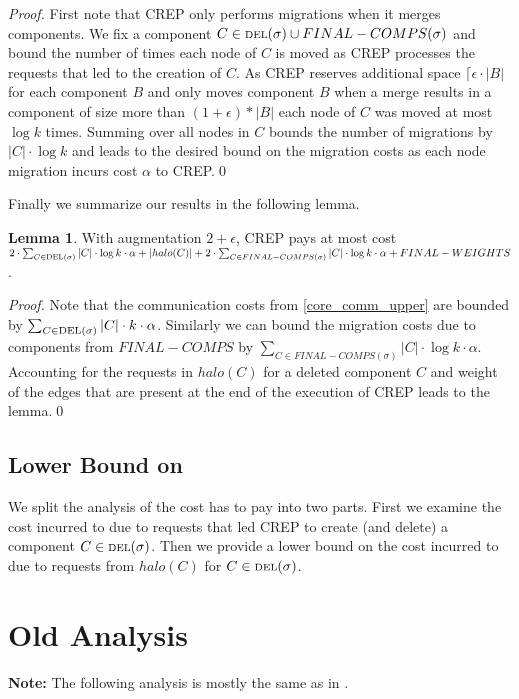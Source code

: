 \documentclass[xcolor=dvipsnames, tikz, 12pt]{article}
\newcommand{\nl}{\newline}
\newcommand{\crep}{C{\scriptsize REP}}
\newcommand{\del}{\text{\scriptsize DEL}}
\newcommand{\opt}{\text{O{\scriptsize PT}}}
\theoremstyle{definition}
\newtheorem{lemma}[defi]{Lemma}
\begin{document}
\textit{Proof.} First note that \crep{} only performs migrations when it merges components.
We fix a component $C\in\del{}(\sigma)\cup FINAL-COMPS(\sigma)$ and bound the number of times each node of $C$ is moved as \crep{} processes the requests that led to the creation of $C$. As \crep{} reserves additional space $\lceil\epsilon\cdot|B|$ for each component $B$ and only moves component $B$ when a merge results in a component of size more than $(1+\epsilon)*|B|$ each node of $C$ was moved at most
$\log k$ times. Summing over all nodes in $C$ bounds the number of migrations by $|C|\cdot\log k$ and leads to the desired bound on the migration costs as each node migration incurs cost $\alpha$ to \crep{}.\qed\nl

Finally we summarize our results in the following lemma.
\begin{lemma}
	\label{crep_upper_bound}
	With augmentation $2+\epsilon$, \crep{} pays at most cost $2\cdot\sum_{C\in\del{}(\sigma)}|C|\cdot\log k\cdot\alpha+|halo(C)|+2\cdot\sum_{C\in FINAL-COMPS(\sigma)}|C|\cdot\log k\cdot\alpha+FINAL-WEIGHTS$.
\end{lemma}
\textit{Proof.} Note that the communication costs from \cref{core_comm_upper} are bounded by $\sum_{C\in\del{}(\sigma)}|C|\cdot k\cdot\alpha$. Similarly we can bound the migration costs due to components from $FINAL-COMPS$ by $\sum_{C\in FINAL-COMPS(\sigma)}|C|\cdot\log k\cdot\alpha$. Accounting for the requests in $halo(C)$ for a deleted component $C$ and weight of the edges that are present at the end of the execution of \crep{} leads to the lemma.\qed


\subsection{Lower Bound on \opt{}}
We split the analysis of the cost \opt{} has to pay into two parts. First we examine the cost incurred to \opt{} due to requests that led \crep{} to create (and delete) a component $C\in\del{}(\sigma)$. Then we provide a lower bound on the cost incurred to \opt{} due to requests from $halo(C)$ for $C\in\del{}(\sigma)$.



\section{Old Analysis}
\textbf{Note:} The following analysis is mostly the same as in \cite{Avin2015}.	
\end{document}
